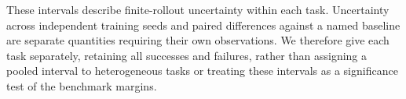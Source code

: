 These intervals describe finite-rollout uncertainty within each task. Uncertainty across independent training seeds and paired differences against a named baseline are separate quantities requiring their own observations. We therefore give each task separately, retaining all successes and failures, rather than assigning a pooled interval to heterogeneous tasks or treating these intervals as a significance test of the benchmark margins.
